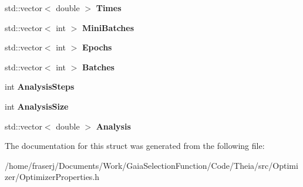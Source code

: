 \begin{DoxyCompactItemize}
std\+::vector$<$ double $>$ {\bfseries Times}
\item 
\mbox{\label{structMemoryBuffer_ae3c426ed9ede4f5c56396efb4d124b9f}} 
std\+::vector$<$ int $>$ {\bfseries Mini\+Batches}
\item 
\mbox{\label{structMemoryBuffer_aa86f98179ea101b944f96521e54c6efb}} 
std\+::vector$<$ int $>$ {\bfseries Epochs}
\item 
\mbox{\label{structMemoryBuffer_a86fe83559e8e303db698259261fba8b8}} 
std\+::vector$<$ int $>$ {\bfseries Batches}
\item 
\mbox{\label{structMemoryBuffer_a88f57d627727f3ae12f2e8cdcef9f7f6}} 
int {\bfseries Analysis\+Steps}
\item 
\mbox{\label{structMemoryBuffer_a2c7b1ba7dda880394e9f7b68c5b553d6}} 
int {\bfseries Analysis\+Size}
\item 
\mbox{\label{structMemoryBuffer_aaa05a44d029283a092aefd582977d1bb}} 
std\+::vector$<$ double $>$ {\bfseries Analysis}
\end{DoxyCompactItemize}


The documentation for this struct was generated from the following file\+:\begin{DoxyCompactItemize}
\item 
/home/fraserj/\+Documents/\+Work/\+Gaia\+Selection\+Function/\+Code/\+Theia/src/\+Optimizer/Optimizer\+Properties.\+h\end{DoxyCompactItemize}
